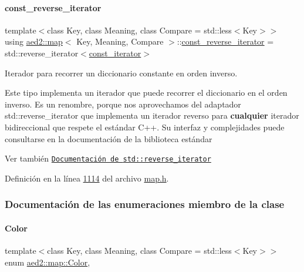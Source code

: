 \paragraph{\texorpdfstring{const\+\_\+reverse\+\_\+iterator}{const\_reverse\_iterator}}
{\footnotesize\ttfamily template$<$class Key, class Meaning, class Compare = std\+::less$<$\+Key$>$$>$ \\
using \hyperlink{classaed2_1_1map}{aed2\+::map}$<$ Key, Meaning, Compare $>$\+::\hyperlink{classaed2_1_1map_aed66a216549d13078a3ea6978ea0b768_aed66a216549d13078a3ea6978ea0b768}{const\+\_\+reverse\+\_\+iterator} =  std\+::reverse\+\_\+iterator$<$\hyperlink{classaed2_1_1map_1_1const__iterator}{const\+\_\+iterator}$>$}



Iterador para recorrer un diccionario constante en orden inverso. 

Este tipo implementa un iterador que puede recorrer el diccionario en el orden inverso. Es un renombre, porque nos aprovechamos del adaptador {\ttfamily std\+::reverse\+\_\+iterator} que implementa un iterador reverso para {\bfseries cualquier} iterador bidireccional que respete el estándar C++. Su interfaz y complejidades puede consultarse en la documentación de la biblioteca estándar

\begin{DoxySeeAlso}{Ver también}
\href{http://en.cppreference.com/w/cpp/iterator/reverse_iterator}{\tt Documentación de {\ttfamily std\+::reverse\+\_\+iterator}} 
\end{DoxySeeAlso}


Definición en la línea \hyperlink{map_8h_source_l01114}{1114} del archivo \hyperlink{map_8h_source}{map.\+h}.



\subsubsection{Documentación de las enumeraciones miembro de la clase}
\mbox{\label{classaed2_1_1map_a6d62a415a4b9d320b30cada4ebcf9f5b_a6d62a415a4b9d320b30cada4ebcf9f5b}} 
\paragraph{\texorpdfstring{Color}{Color}}
{\footnotesize\ttfamily template$<$class Key, class Meaning, class Compare = std\+::less$<$\+Key$>$$>$ \\
enum \hyperlink{classaed2_1_1map_a6d62a415a4b9d320b30cada4ebcf9f5b_a6d62a415a4b9d320b30cada4ebcf9f5b}{aed2\+::map\+::\+Color}\hspace{0.3cm}{\ttfamily [strong]}, {\ttfamily [private]}}



